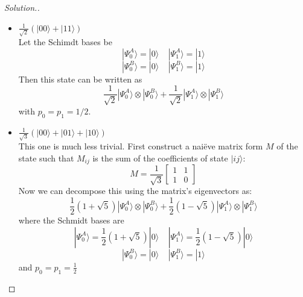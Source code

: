 \documentclass[12pt]{article}
\begin{document}
\begin{proof}[Solution.]~\\
\begin{itemize}
\item $\frac{1}{\sqrt{2}}(|00\rangle+|11\rangle)$\\
Let the Schimdt bases be
$$|\Psi^A_0\rangle=|0\rangle\;\;\;\;|\Psi_1^A\rangle=|1\rangle$$
$$|\Psi^B_0\rangle=|0\rangle\;\;\;\;|\Psi_1^B\rangle=|1\rangle$$
Then this state can be written as 
$$\frac{1}{\sqrt{2}}|\Psi_0^A\rangle\otimes|\Psi_0^B\rangle+\frac{1}{\sqrt{2}}|\Psi_1^A\rangle\otimes|\Psi_1^B\rangle$$
with $p_0=p_1=1/2$.
\item $\frac{1}{\sqrt{3}}(|00\rangle+|01\rangle+|10\rangle)$\\
This one is much less trivial. First construct a nai\"eve matrix form $M$ of the state such that $M_{ij}$ is the sum of the coefficients of state $|ij\rangle$:
$$M=\frac{1}{\sqrt{3}}\begin{bmatrix}
1 & 1\\
1 & 0
\end{bmatrix}$$
Now we can decompose this using the matrix's eigenvectors as:
$$\frac{1}{2}(1+\sqrt{5})|\Psi_0^A\rangle\otimes|\Psi_0^B\rangle+\frac{1}{2}(1-\sqrt{5})|\Psi_1^A\rangle\otimes|\Psi_1^B\rangle$$
where the Schmidt bases are
$$|\Psi^A_0\rangle=\frac{1}{2}(1+\sqrt{5})|0\rangle\;\;\;\;|\Psi_1^A\rangle=\frac{1}{2}(1-\sqrt{5})|0\rangle$$
$$|\Psi^B_0\rangle=|0\rangle\;\;\;\;|\Psi_1^B\rangle=|1\rangle$$
and $p_0=p_1=\frac{1}{2}$
\end{itemize}
\end{proof}
\end{document}
